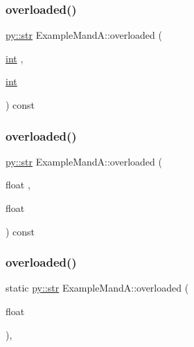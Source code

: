 \subsubsection{\texorpdfstring{overloaded()}{overloaded()}\hspace{0.1cm}{\footnotesize\ttfamily [10/12]}}
{\footnotesize\ttfamily \mbox{\hyperlink{node_8h_a62b34ca1362fe946082b7aa0cd9be844}{py\+::str}} Example\+Mand\+A\+::overloaded (\begin{DoxyParamCaption}\item[{\mbox{\hyperlink{warnings_8h_a74f207b5aa4ba51c3a2ad59b219a423b}{int}}}]{,  }\item[{\mbox{\hyperlink{warnings_8h_a74f207b5aa4ba51c3a2ad59b219a423b}{int}}}]{ }\end{DoxyParamCaption}) const\hspace{0.3cm}{\ttfamily [inline]}}

\mbox{\label{class_example_mand_a_a76a075321230929e498a435a0af844d6}} 
\subsubsection{\texorpdfstring{overloaded()}{overloaded()}\hspace{0.1cm}{\footnotesize\ttfamily [11/12]}}
{\footnotesize\ttfamily \mbox{\hyperlink{node_8h_a62b34ca1362fe946082b7aa0cd9be844}{py\+::str}} Example\+Mand\+A\+::overloaded (\begin{DoxyParamCaption}\item[{float}]{,  }\item[{float}]{ }\end{DoxyParamCaption}) const\hspace{0.3cm}{\ttfamily [inline]}}

\mbox{\label{class_example_mand_a_a56779090f2926f5037d3d98f676c8a2a}} 
\subsubsection{\texorpdfstring{overloaded()}{overloaded()}\hspace{0.1cm}{\footnotesize\ttfamily [12/12]}}
{\footnotesize\ttfamily static \mbox{\hyperlink{node_8h_a62b34ca1362fe946082b7aa0cd9be844}{py\+::str}} Example\+Mand\+A\+::overloaded (\begin{DoxyParamCaption}\item[{float}]{ }\end{DoxyParamCaption})\hspace{0.3cm}{\ttfamily [inline]}, {\ttfamily [static]}}


